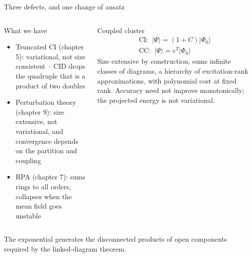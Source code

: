 \documentclass[aspectratio=169,10pt]{beamer}
\newcommand{\ket}[1]{\vert #1\rangle}
\newcommand{\ph}{\Phi_0}
\begin{document}
\begin{frame}{Three defects, and one change of ansatz}
\small
\begin{columns}[T]
\begin{block}{What we have}
\begin{itemize}
\item Truncated CI (chapter 5): variational, \alert{not size consistent} -- CID drops the quadruple that is a product of two doubles
\item Perturbation theory (chapter 9): size extensive, \alert{not variational}, and convergence depends on the partition and coupling
\item RPA (chapter 7): sums rings to all orders, collapses when the mean field goes unstable
\end{itemize}
\end{block}
\begin{block}{Coupled cluster}
\[
\begin{gathered}\text{CI: }\ \ket{\Psi}=(1+C)\ket{\ph}
\\[5pt]\text{CC: }\ \boxed{\ket{\Psi}=e^{T}\ket{\ph}}\end{gathered}
\]
Size extensive by construction, sums infinite classes of diagrams, a hierarchy of excitation-rank approximations, with polynomial cost at fixed rank. Accuracy need not improve monotonically; the projected energy is not variational.
\end{block}
\end{columns}
\vspace{0.5em}
\small The exponential generates the disconnected products of open components required by the linked-diagram theorem.
\end{frame}
\end{document}
